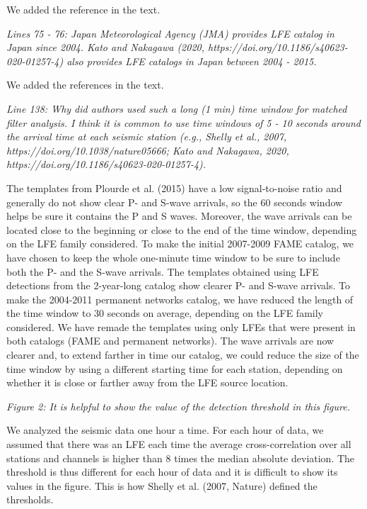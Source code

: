 \documentclass[letterpaper, 12pt]{article}
\begin{document}
\bigskip

We added the reference in the text.

\bigskip

\textit{Lines 75 - 76: Japan Meteorological Agency (JMA) provides LFE catalog in Japan since 2004. Kato and Nakagawa (2020, https://doi.org/10.1186/s40623-020-01257-4) also provides LFE catalogs in Japan between 2004 - 2015.}

\bigskip

We added the references in the text.

\bigskip

\textit{Line 138: Why did authors used such a long (1 min) time window for matched filter analysis. I think it is common to use time windows of 5 - 10 seconds around the arrival time at each seismic station (e.g., Shelly et al., 2007, https://doi.org/10.1038/nature05666; Kato and Nakagawa, 2020, https://doi.org/10.1186/s40623-020-01257-4).}

\bigskip

The templates from Plourde et al. (2015) have a low signal-to-noise ratio and generally do not show clear P- and S-wave arrivals, so the 60 seconds window helps be sure it contains the P and S waves. Moreover, the wave arrivals can be located close to the beginning or close to the end of the time window, depending on the LFE family considered. To make the initial 2007-2009 FAME catalog, we have chosen to keep the whole one-minute time window to be sure to include both the P- and the S-wave arrivals. The templates obtained using LFE detections from the 2-year-long catalog show clearer P- and S-wave arrivals. To make the 2004-2011 permanent networks catalog, we have reduced the length of the time window to 30 seconds on average, depending on the LFE family considered. We have remade the templates using only LFEs that were present in both catalogs (FAME and permanent networks). The wave arrivals are now clearer and, to extend farther in time our catalog, we could reduce the size of the time window by using a different starting time for each station, depending on whether it is close or farther away from the LFE source location. 

\bigskip

\textit{Figure 2: It is helpful to show the value of the detection threshold in this figure.}

\bigskip

We analyzed the seismic data one hour a time. For each hour of data, we assumed that there was an LFE each time the average cross-correlation over all stations and channels is higher than 8 times the median absolute deviation. The threshold is thus different for each hour of data and it is difficult to show its values in the figure. This is how Shelly et al. (2007, Nature) defined the thresholds.
\end{document}
